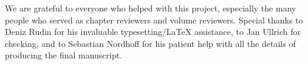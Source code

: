 
We are grateful to everyone who helped with this project, especially the many people who served as chapter reviewers and volume reviewers. Special thanks to Deniz Rudin for his invaluable typesetting/LaTeX assistance, to Jan Ullrich for  checking, and to Sebastian Nordhoff for his patient help with all the details of producing the final manuscript. 
  

